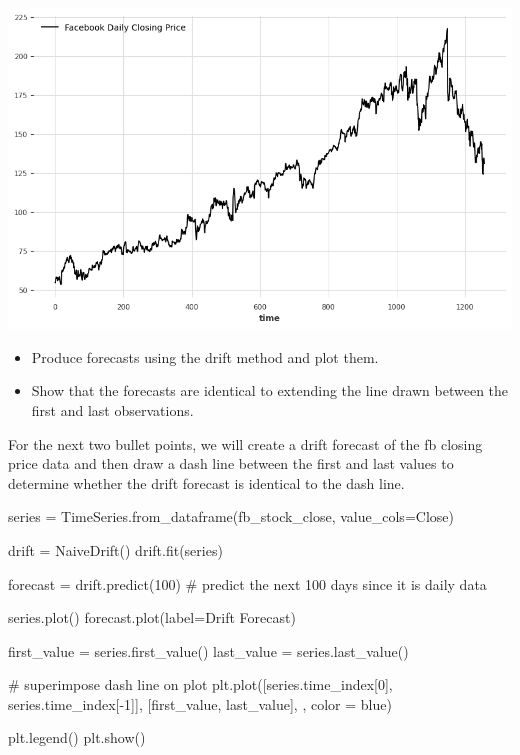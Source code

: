 \documentclass[
  11pt,
]{article}
\newenvironment{Shaded}{\begin{snugshade}}{\end{snugshade}}
\newcommand{\CommentTok}[1]{\textcolor[rgb]{0.37,0.37,0.37}{#1}}
\newcommand{\DecValTok}[1]{\textcolor[rgb]{0.68,0.00,0.00}{#1}}
\newcommand{\NormalTok}[1]{\textcolor[rgb]{0.00,0.23,0.31}{#1}}
\newcommand{\OperatorTok}[1]{\textcolor[rgb]{0.37,0.37,0.37}{#1}}
\newcommand{\StringTok}[1]{\textcolor[rgb]{0.13,0.47,0.30}{#1}}
\begin{document}
\includegraphics{hw3_files/figure-pdf/cell-30-output-1.png}

\begin{itemize}
\item
  Produce forecasts using the drift method and plot them.
\item
  Show that the forecasts are identical to extending the line drawn
  between the first and last observations.
\end{itemize}

For the next two bullet points, we will create a drift forecast of the
fb closing price data and then draw a dash line between the first and
last values to determine whether the drift forecast is identical to the
dash line.

\begin{Shaded}
\begin{Highlighting}[]

\NormalTok{series }\OperatorTok{=}\NormalTok{ TimeSeries.from\_dataframe(fb\_stock\_close, value\_cols}\OperatorTok{=}\StringTok{\textquotesingle{}Close\textquotesingle{}}\NormalTok{)}

\NormalTok{drift }\OperatorTok{=}\NormalTok{ NaiveDrift()}
\NormalTok{drift.fit(series)}

\NormalTok{forecast }\OperatorTok{=}\NormalTok{ drift.predict(}\DecValTok{100}\NormalTok{) }\CommentTok{\# predict the next 100 days since it is daily data}

\NormalTok{series.plot()}
\NormalTok{forecast.plot(label}\OperatorTok{=}\StringTok{\textquotesingle{}Drift Forecast\textquotesingle{}}\NormalTok{)}

\NormalTok{first\_value }\OperatorTok{=}\NormalTok{ series.first\_value()}
\NormalTok{last\_value }\OperatorTok{=}\NormalTok{ series.last\_value()}

\CommentTok{\# superimpose dash line on plot}
\NormalTok{plt.plot([series.time\_index[}\DecValTok{0}\NormalTok{], series.time\_index[}\OperatorTok{{-}}\DecValTok{1}\NormalTok{]], [first\_value, last\_value], }\StringTok{\textquotesingle{}{-}{-}\textquotesingle{}}\NormalTok{, color }\OperatorTok{=} \StringTok{\textquotesingle{}blue\textquotesingle{}}\NormalTok{)}

\NormalTok{plt.legend()}
\NormalTok{plt.show()}
\end{Highlighting}
\end{Shaded}
\end{document}
